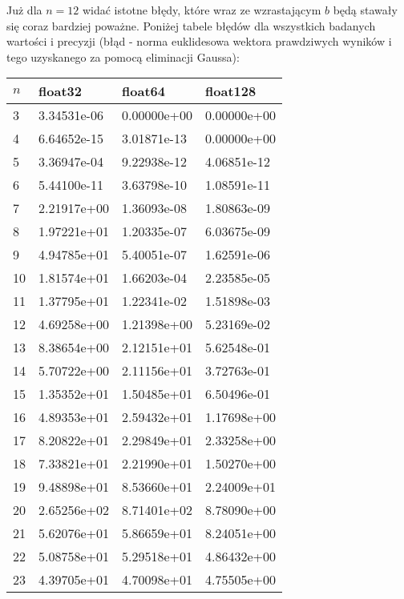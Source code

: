 \documentclass{article}
\begin{document}
Już dla $n=12$ widać istotne błędy, które wraz ze wzrastającym $b$ będą stawały się coraz bardziej poważne.
Poniżej tabele błędów dla wszystkich badanych wartości i precyzji (błąd - norma euklidesowa wektora prawdziwych wyników i tego
uzyskanego za pomocą eliminacji Gaussa):

\newpage
\thispagestyle{empty}

\begin{table}[H]
\parbox{.45\linewidth}{
\hspace*{-2.4cm}
\begin{tabular}{|l|l|l|l|}
\hline
$n$ & float32 & float64 & float128 \\ \hline
3 & 3.34531e-06 & 0.00000e+00 & 0.00000e+00 \\ \hline
4 & 6.64652e-15 & 3.01871e-13 & 0.00000e+00 \\ \hline
5 & 3.36947e-04 & 9.22938e-12 & 4.06851e-12 \\ \hline
6 & 5.44100e-11 & 3.63798e-10 & 1.08591e-11 \\ \hline
7 & 2.21917e+00 & 1.36093e-08 & 1.80863e-09 \\ \hline
8 & 1.97221e+01 & 1.20335e-07 & 6.03675e-09 \\ \hline
9 & 4.94785e+01 & 5.40051e-07 & 1.62591e-06 \\ \hline
10 & 1.81574e+01 & 1.66203e-04 & 2.23585e-05 \\ \hline
11 & 1.37795e+01 & 1.22341e-02 & 1.51898e-03 \\ \hline
12 & 4.69258e+00 & 1.21398e+00 & 5.23169e-02 \\ \hline
13 & 8.38654e+00 & 2.12151e+01 & 5.62548e-01 \\ \hline
14 & 5.70722e+00 & 2.11156e+01 & 3.72763e-01 \\ \hline
15 & 1.35352e+01 & 1.50485e+01 & 6.50496e-01 \\ \hline
16 & 4.89353e+01 & 2.59432e+01 & 1.17698e+00 \\ \hline
17 & 8.20822e+01 & 2.29849e+01 & 2.33258e+00 \\ \hline
18 & 7.33821e+01 & 2.21990e+01 & 1.50270e+00 \\ \hline
19 & 9.48898e+01 & 8.53660e+01 & 2.24009e+01 \\ \hline
20 & 2.65256e+02 & 8.71401e+02 & 8.78090e+00 \\ \hline
21 & 5.62076e+01 & 5.86659e+01 & 8.24051e+00 \\ \hline
22 & 5.08758e+01 & 5.29518e+01 & 4.86432e+00 \\ \hline
23 & 4.39705e+01 & 4.70098e+01 & 4.75505e+00 \\ \hline

\end{tabular}}
\end{table}
\end{document}
